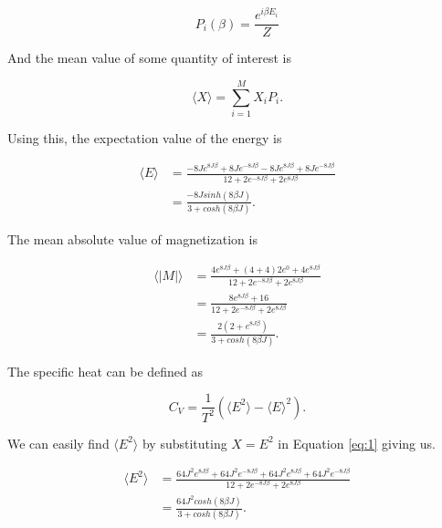\documentclass[%
oneside,                 %
final,                   %
10pt]{article}
\begin{document}
\begin{equation*}
P_i(\beta)= \frac{e^{i \beta E_i}}{Z}
\end{equation*}

And the mean value of some quantity of interest is 

\begin{equation}\label{eq:1}
\langle X \rangle = \sum_{i=1}^M X_i P_i.
\end{equation}

Using this, the expectation value of the energy is 

\begin{equation*}
\begin{split}
\langle E \rangle & = \frac{-8J e^{8 J \beta}+8J e^{-8 J \beta} -8J e^{8 J \beta} + 8J e^{-8 J \beta}}{12+2e^{-8 J \beta} + 2e^{8 J \beta}} \\
& = \frac{-8 J sinh(8 \beta J)}{3 + cosh(8 \beta J)}.
\end{split}
\end{equation*}

The mean absolute value of magnetization is

\begin{equation*}
\begin{split}
\langle |M| \rangle & = \frac{4 e^{8 J \beta}+(4+4)2 e^{0} + 4 e^{8 J \beta} }{12+2e^{-8 J \beta} + 2e^{8 J \beta}} \\
& = \frac{8e^{8 J \beta}+16}{12+2e^{-8 J \beta} + 2e^{8 J \beta}} \\
& = \frac{2(2+e^{8 J \beta})}{3 + cosh(8 \beta J)}.
\end{split}
\end{equation*}

The specific heat can be defined as 

\begin{equation*}
C_V=\frac{1}{T^2} (\langle E^2 \rangle - \langle E \rangle ^2).
\end{equation*}

We can easily find $\langle E^2 \rangle$ by substituting $X=E^2$ in Equation \ref{eq:1} giving us.

\begin{equation*}
\begin{split}
\langle E^2 \rangle & = \frac{64J^2 e^{8 J \beta}+64J^2 e^{-8 J \beta} +64J^2 e^{8 J \beta} + 64J^2 e^{-8 J \beta}}{12+2e^{-8 J \beta} + 2e^{8 J \beta}} \\
& = \frac{64 J^2 cosh(8 \beta J)}{3 + cosh(8 \beta J)}.
\end{split}
\end{equation*}
\end{document}
